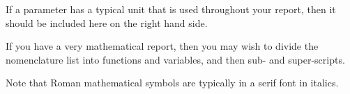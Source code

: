 \documentclass[a4paper,oneside,12pt]{book}
\begin{document}
If a parameter has a typical unit that is used throughout your report, then it should be included here on the right hand side.

If you have a very mathematical report, then you may wish to divide the nomenclature list into functions and variables, and then sub- and super-scripts.

Note that Roman mathematical symbols are typically in a serif font in italics.

\mainmatter









\appendix
\renewcommand{\thechapter}{A\arabic{chapter}}
\end{document}
